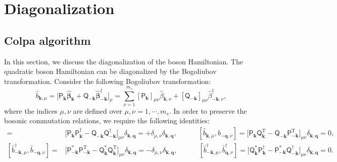 \documentclass[aps, prx, nofootinbib, superscriptaddress]{revtex4-2}
\newcommand{\kvec}{\mathbf{k}}
\begin{document}
\section{Diagonalization}

\subsection{Colpa algorithm}

In this section, we discuss the diagonalization of the boson Hamiltonian. 
The quadratic boson Hamiltonian can be diagonalized by the Bogoliubov transformation. 
Consider the following Bogoliubov transformation:
\begin{equation}
    \hat{b}_{\kvec, \mu} 
    = \big[ \mathsf{P}_{\kvec}^{\phantom \dagger} \hat{\bm \beta}_{\kvec}^{\phantom \dagger} + \mathsf{Q}_{-\kvec}^{\phantom \dagger} \hat{\bm \beta}_{-\kvec}^{\dagger} \big]_{\mu}
    = \sum_{\nu = 1}^{m_s} [\mathsf{P}_{\kvec}]_{\mu\nu}^{\phantom \dagger} \hat{\beta}_{\kvec, \nu}^{\phantom \dagger} + [\mathsf{Q}_{-\kvec}]_{\mu\nu}^{\phantom \dagger} \hat{\beta}_{-\kvec, \nu}^{\dagger},
\end{equation}
where the indices $\mu, \nu$ are defined over $\mu, \nu = 1, \cdots, m_s$.
In order to preserve the bosonic commutation relations, we require the following identities:
\begin{align*}
    [\hat{b}_{  \kvec, \mu}^{\phantom \dagger}, \hat{b}_{  \mathbf{q}, \nu}^{\dagger}] 
    = & \big[ \mathsf{P}_{\kvec}\mathsf{P}_{\kvec}^{\dagger} - \mathsf{Q}_{-\kvec}\mathsf{Q}_{-\kvec}^{\dagger} \big]_{\mu\nu} \delta_{\kvec,\mathbf{q}}
    = + \delta_{\mu,\nu}    \delta_{\kvec, \mathbf{q}} ,
    \qquad \quad
    [\hat{b}_{  \kvec, \mu}, \hat{b}_{-\mathbf{q}, \nu}] 
    = \big[ \mathsf{P}_{\kvec}\mathsf{Q}_{\kvec}^{\mathrm{T}} - \mathsf{Q}_{-\kvec}\mathsf{P}_{-\kvec}^{\mathrm{T}} \big]_{\mu\nu} \delta_{\kvec,\mathbf{q}} = 0, \\
    [\hat{b}_{-\kvec, \mu}^{\dagger}, \hat{b}_{-\mathbf{q}, \nu}^{\phantom \dagger}] 
    = & \big[ \mathsf{P}_{-\kvec}^{*}\mathsf{P}_{-\kvec}^{\mathrm{T}} - \mathsf{Q}_{\kvec}^{*}\mathsf{Q}_{\kvec}^{\mathrm{T}} \big]_{\mu\nu} \delta_{\kvec,\mathbf{q}}
    = - \delta_{\mu,\nu}    \delta_{\kvec, \mathbf{q}}, 
    \qquad \quad
    [\hat{b}_{-\kvec, \mu}^{\dagger}, \hat{b}_{  \mathbf{q}, \nu}^{\dagger}] 
    = \big[ \mathsf{Q}_{\kvec}^{*}\mathsf{P}_{\kvec}^{\dagger} - \mathsf{P}_{-\kvec}^{*}\mathsf{Q}_{-\kvec}^{\dagger} \big]_{\mu\nu} \delta_{\kvec,\mathbf{q}}
    = 0.
\end{align*}
\end{document}
